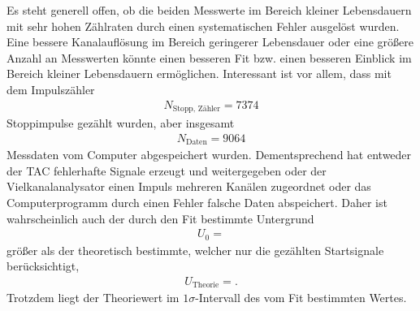 Es steht generell offen, ob die beiden Messwerte im Bereich kleiner Lebensdauern mit sehr hohen Zählraten durch einen systematischen Fehler ausgelöst wurden. %
Eine bessere Kanalauflösung im Bereich geringerer Lebensdauer oder eine größere Anzahl an Messwerten könnte einen besseren Fit bzw. einen besseren Einblick im Bereich kleiner Lebensdauern ermöglichen.
Interessant ist vor allem, dass mit dem Impulszähler
\begin{align*}
  N_\text{Stopp, Zähler} = \num{7374}
\end{align*}
Stoppimpulse gezählt wurden, aber insgesamt
\begin{align*}
  N_\text{Daten} = \num{9064}
\end{align*}
Messdaten vom Computer abgespeichert wurden.
Dementsprechend hat entweder der TAC fehlerhafte Signale erzeugt und weitergegeben oder der Vielkanalanalysator einen Impuls mehreren Kanälen zugeordnet oder das Computerprogramm durch einen Fehler falsche Daten abspeichert.
Daher ist wahrscheinlich auch der durch den Fit bestimmte Untergrund
\begin{align*}
  U_0 = 
\end{align*}
größer als der theoretisch bestimmte, welcher nur die gezählten Startsignale berücksichtigt,
\begin{align*}
  U_{\text{Theorie}} = .
\end{align*}
Trotzdem liegt der Theoriewert im $1\sigma$-Intervall des vom Fit bestimmten Wertes.

